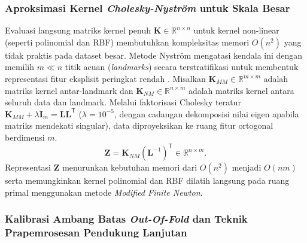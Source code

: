 \subsubsection{Aproksimasi Kernel \textit{Cholesky-Nystr\"om} untuk Skala Besar}

Evaluasi langsung matriks kernel penuh $\mathbf{K} \in \mathbb{R}^{n \times n}$ untuk kernel non-linear (seperti polinomial dan RBF) membutuhkan kompleksitas memori $O(n^2)$ yang tidak praktis pada dataset besar. Metode Nystr\"om mengatasi kendala ini dengan memilih $m \ll n$ titik acuan (\textit{landmarks}) secara terstratifikasi untuk membentuk representasi fitur eksplisit peringkat rendah \cite{williams2001nystrom}. Misalkan $\mathbf{K}_{MM} \in \mathbb{R}^{m \times m}$ adalah matriks kernel antar-landmark dan $\mathbf{K}_{NM} \in \mathbb{R}^{n \times m}$ adalah matriks kernel antara seluruh data dan landmark. Melalui faktorisasi Cholesky teratur $\mathbf{K}_{MM} + \lambda \mathbf{I}_m = \mathbf{L}\mathbf{L}^{\mathsf{T}}$ ($\lambda = 10^{-5}$, dengan cadangan dekomposisi nilai eigen apabila matriks mendekati singular), data diproyeksikan ke ruang fitur ortogonal berdimensi $m$.
\begin{equation}
    \mathbf{Z} = \mathbf{K}_{NM} (\mathbf{L}^{-1})^{\mathsf{T}} \in \mathbb{R}^{n \times m}.
    \label{eq:nystrom-proj}
\end{equation}
Representasi $\mathbf{Z}$ menurunkan kebutuhan memori dari $O(n^2)$ menjadi $O(nm)$ serta memungkinkan kernel polinomial dan RBF dilatih langsung pada ruang primal menggunakan metode \textit{Modified Finite Newton}.

\subsubsection{Kalibrasi Ambang Batas \textit{Out-Of-Fold} dan Teknik Prapemrosesan Pendukung Lanjutan}

